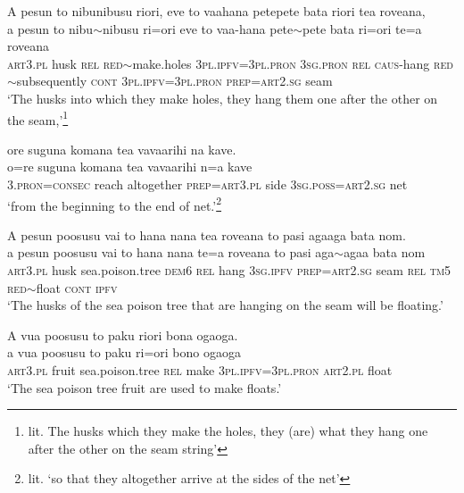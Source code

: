 \newpage
\ea\label{ex:text5-6}
A pesun to nibunibusu riori, eve to vaahana petepete bata riori tea roveana,\\
\gll a	pesun	to	nibu{$\sim$}nibusu	ri=ori	eve	to	vaa-hana	pete{$\sim$}pete	bata	ri=ori	te=a	roveana\\
     \textsc{art}3.\textsc{pl}	husk	\textsc{rel}	\textsc{red}{$\sim$}make.holes	3\textsc{pl}.\textsc{ipfv}=3\textsc{pl}.\textsc{pron}	3\textsc{sg}.\textsc{pron}	\textsc{rel}	\textsc{caus}-hang	\textsc{red}{$\sim$}subsequently	\textsc{cont}	3\textsc{pl}.\textsc{ipfv}=3\textsc{pl}.\textsc{pron}	\textsc{prep}=\textsc{art}2.\textsc{sg}	seam\\
\glt `The husks into which they make holes, they hang them one after the other on the seam,'\footnote{lit. The husks which they make the holes, they (are) what they hang one after the other on the seam string'}
\z

\ea\label{ex:text5-7}
ore suguna komana tea vavaarihi na kave.\\
\gll o=re	suguna	komana	tea	vavaarihi	n=a	kave\\
     3.\textsc{pron}=\textsc{consec}	reach	altogether	\textsc{prep}=\textsc{art}3.\textsc{pl}	side	3\textsc{sg}.\textsc{poss}=\textsc{art}2.\textsc{sg}	net\\
\glt `from the beginning to the end of net.'\footnote{lit. `so that they altogether arrive at the sides of the net'}
\z

\ea\label{ex:text5-8}
A pesun poosusu vai to hana nana tea roveana to pasi agaaga bata nom.\\
\gll a	pesun	poosusu	vai	to	hana	nana	te=a	roveana	to	pasi	aga{$\sim$}agaa	bata	nom\\
     \textsc{art}3.\textsc{pl}	husk	sea.poison.tree	\textsc{dem}6	\textsc{rel}	hang	3\textsc{sg}.\textsc{ipfv}	\textsc{prep}=\textsc{art}2.\textsc{sg}	seam	\textsc{rel}	\textsc{tm}5	\textsc{red}{$\sim$}float	\textsc{cont}	\textsc{ipfv}\\
\glt `The husks of the sea poison tree that are hanging on the seam will be floating.'
\z

\ea\label{ex:text5-9}
A vua poosusu to paku riori bona ogaoga.\\
\gll a	vua	poosusu	to	paku	ri=ori	bono	ogaoga\\
     \textsc{art}3.\textsc{pl}	fruit	sea.poison.tree	\textsc{rel}	make	3\textsc{pl}.\textsc{ipfv}=3\textsc{pl}.\textsc{pron}	\textsc{art}2.\textsc{pl}	float\\
\glt `The sea poison tree fruit are used to make floats.'
\z
